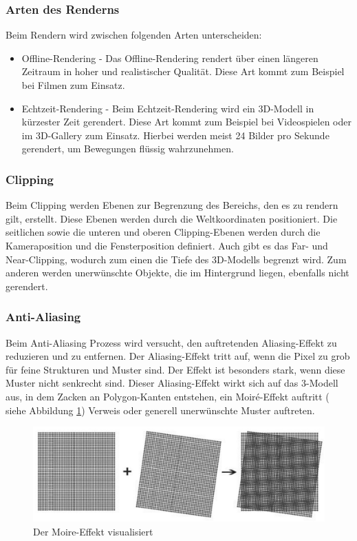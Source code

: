 \subsubsection{Arten des Renderns}
Beim Rendern wird zwischen folgenden Arten unterscheiden:

\begin{itemize}
    \item Offline-Rendering - Das Offline-Rendering rendert über einen längeren Zeitraum in hoher und realistischer Qualität. Diese Art kommt zum Beispiel bei Filmen zum Einsatz. 
    \item Echtzeit-Rendering - Beim Echtzeit-Rendering wird ein 3D-Modell in kürzester Zeit gerendert. Diese Art kommt zum Beispiel bei Videospielen oder im 3D-Gallery zum Einsatz. Hierbei werden meist 24 Bilder pro Sekunde gerendert, um Bewegungen flüssig wahrzunehmen. 
\end{itemize}
\cite{RenderArten}

\subsubsection{Clipping}
Beim Clipping werden Ebenen zur Begrenzung des Bereichs, den es zu rendern gilt, erstellt. Diese Ebenen werden durch die Weltkoordinaten positioniert. Die seitlichen sowie die unteren und oberen Clipping-Ebenen werden durch die Kameraposition und die Fensterposition definiert. Auch gibt es das Far- und Near-Clipping, wodurch zum einen die Tiefe des 3D-Modells begrenzt wird. Zum anderen werden unerwünschte Objekte, die im Hintergrund liegen, ebenfalls nicht gerendert. \cite{Rendering3DModels}


\subsubsection{Anti-Aliasing}
Beim Anti-Aliasing Prozess wird versucht, den auftretenden Aliasing-Effekt zu reduzieren und zu entfernen. Der Aliasing-Effekt tritt auf, wenn die Pixel zu grob für feine Strukturen und Muster sind. Der Effekt ist besonders stark, wenn diese Muster nicht senkrecht sind. Dieser Aliasing-Effekt wirkt sich auf das 3-Modell aus, in dem Zacken an Polygon-Kanten entstehen, ein Moiré-Effekt auftritt ( siehe Abbildung \ref{fig:impl:MoireEffekt}) Verweis oder generell unerwünschte Muster auftreten.\cite{Rendering3DModels} 
\begin{figure}
    \centering
    \includegraphics[scale=0.3]{pics/moire-effekt.jpg}
    \caption{Der Moire-Effekt visualisiert \cite{MoireEffekt}}
    \label{fig:impl:MoireEffekt}
\end{figure}

